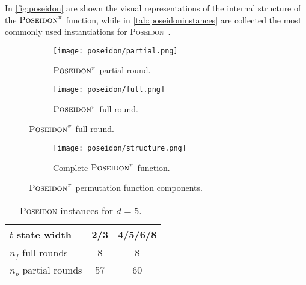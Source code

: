 \documentclass[12pt, a4paper]{report}
\begin{document}
In \autoref{fig:poseidon} are shown the visual representations of the internal structure of the $\textsc{Poseidon}^\pi$ function, while in \autoref{tab:poseidoninstances} are collected the most commonly used instantiations for \textsc{Poseidon}~\cite[Tab.2]{poseidon}.

\begin{figure}[H]
  \begin{center}
    \begin{subfigure}{0.40\textwidth}
      \texttt{[image: poseidon/partial.png]}
      \caption{$\textsc{Poseidon}^\pi$ partial round.}\label{subfig:poseidonpartial}
    \end{subfigure}
    \hfill
    \begin{subfigure}{0.40\textwidth}
      \texttt{[image: poseidon/full.png]}
      \caption{$\textsc{Poseidon}^\pi$ full round.}\label{subfig:poseidonfull}
    \end{subfigure}
  \end{center}
\end{figure}
\renewcommand\thesubfigure{c}
\begin{figure}[H]
  \begin{center}
    \begin{subfigure}{0.40\textwidth}
      \texttt{[image: poseidon/structure.png]}
      \caption{Complete $\textsc{Poseidon}^\pi$ function.}\label{subfig:poseidonstructure}
    \end{subfigure}
  \end{center}
  \caption{$\textsc{Poseidon}^\pi$ permutation function components.~\cite[Fig.~2]{poseidon}}\label{fig:poseidon}
\end{figure}

\begin{table}[H]
  \caption{\textsc{Poseidon} instances for $d=5$.~\cite[Tab.2]{poseidon}}\label{tab:poseidoninstances}
  \begin{center}
    \begin{tabular}{|l|c|c|}
      \hline
      $t$ state width & 2/3 & 4/5/6/8 \\
      \hline
      $n_f$ full rounds & 8 & 8 \\
      \hline
      $n_p$ partial rounds & 57 & 60 \\
      \hline
    \end{tabular}
  \end{center}
\end{table}
\end{document}

